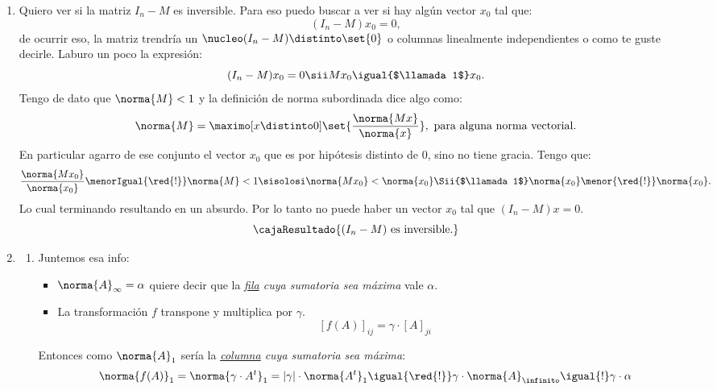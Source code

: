 \begin{enumerate}[label=(\alph*)]
  \item\label{extra-1:itema} Quiero ver si la matriz $I_n - M$ es inversible. Para eso puedo buscar a ver si hay algún vector $x_0$ tal que:
        $$
          (I_n - M)x_0 = 0,
        $$
        de ocurrir eso, la matriz trendría un $\nucleo(I_n - M) \distinto \set{0}$ o columnas linealmente independientes o como te guste decirle.
        Laburo un poco la expresión:
        $$
          (I_n - M)x_0 = 0
          \sii
          Mx_0 \igual{$\llamada1$} x_0.
        $$
        Tengo de dato que $\norma{M} < 1$ y la definición de norma subordinada dice algo como:
        $$
          \norma{M} = \maximo[x \distinto 0]\set{{\frac{\norma{Mx}}{\norma{x}}}}, \text{ para alguna norma vectorial}.
        $$
        En particular agarro de ese conjunto el vector $x_0$ que es por hipótesis distinto de 0, sino no tiene gracia. Tengo que:
        $$
          \frac{\norma{Mx_0}}{\norma{x_0}}
          \menorIgual{\red{!}}
          \norma{M} < 1
          \sisolosi
          \norma{Mx_0} < \norma{x_0}
          \Sii{$\llamada1$}
          \norma{x_0} \menor{\red{!}} \norma{x_0}.
        $$
        Lo cual terminando resultando en un absurdo. Por lo tanto no puede haber un vector $x_0$ tal que
        $(I_n - M) x = 0$.
        $$
          \cajaResultado{
            (I_n - M)  \text{ es inversible.}
          }
        $$

  \item
        \begin{enumerate}[label=\roman*)]
          \item\label{extra-1:itembi}
                Juntemos esa info:
                \begin{itemize}
                  \item $\norma{A}_\infty = \alpha$ quiere decir que la \textit{\underline{fila} cuya sumatoria sea máxima} vale $\alpha$.

                  \item La transformación $f$ transpone y multiplica por $\gamma$.
                        $$
                          [f(A)]_{ij} = \gamma \cdot [A]_{ji}
                        $$
                \end{itemize}

                Entonces como $\norma{A}_1$ sería la \textit{\underline{columna} cuya sumatoria sea máxima}:
                $$
                  \norma{f(A)}_1 =
                  \norma{\gamma \cdot A^t}_1 =
                  |\gamma| \cdot \norma{A^t}_1 \igual{\red{!}}
                  \gamma \cdot \norma{A}_\infinito \igual{!}
                  \gamma \cdot \alpha
                $$


\end{enumerate}
\end{enumerate}
